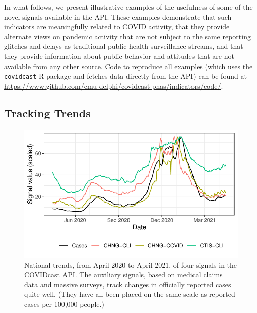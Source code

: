 \documentclass[9pt,twocolumn,twoside,lineno]{pnas-new}
\begin{document}
In what follows, we present illustrative examples of the usefulness of some of
the novel signals available in the API. These examples demonstrate that such
indicators are meaningfully related to COVID activity, that they provide
alternate views on pandemic activity that are not subject to the same reporting
glitches and delays as traditional public health surveillance streams, and that
they provide information about public behavior and attitudes that are not
available from any other source. Code to reproduce all examples (which uses the
\texttt{covidcast} R package and fetches data directly from the API) can be
found at
\url{https://www.github.com/cmu-delphi/covidcast-pnas/indicators/code/}. 

\subsection{Tracking Trends}

\begin{figure}
  \centering
  \includegraphics[width=\columnwidth]{fig/time_trends_national.pdf}
  \caption{National trends, from April 2020 to April 2021, of four signals in
    the COVIDcast API. The auxiliary signals, based on medical claims data and
    massive surveys, track changes in officially reported cases quite
    well. (They have all been placed on the same scale as reported cases per
    100,000 people.)}
  \label{fig:time_trends_national}
\end{figure}
\end{document}

